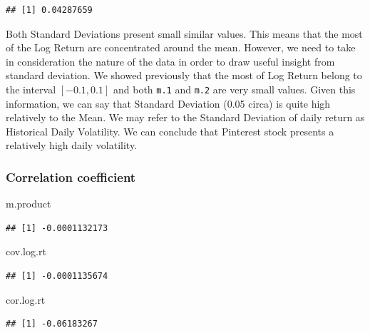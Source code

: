 \documentclass[
]{article}
\newenvironment{Shaded}{\begin{snugshade}}{\end{snugshade}}
\newcommand{\NormalTok}[1]{#1}
\begin{document}
\begin{verbatim}
## [1] 0.04287659
\end{verbatim}

Both Standard Deviations present small similar values. This means that
the most of the Log Return are concentrated around the mean. However, we
need to take in consideration the nature of the data in order to draw
useful insight from standard deviation. We showed previously that the
most of Log Return belong to the interval \([-0.1, 0.1]\) and both
\texttt{m.1} and \texttt{m.2} are very small values. Given this
information, we can say that Standard Deviation (0.05 circa) is quite
high relatively to the Mean. We may refer to the Standard Deviation of
daily return as Historical Daily Volatility. We can conclude that
Pinterest stock presents a relatively high daily volatility.

\hypertarget{correlation-coefficient}{%
\subsubsection{Correlation coefficient}\label{correlation-coefficient}}

\begin{Shaded}
\begin{Highlighting}[]
\NormalTok{m.product}
\end{Highlighting}
\end{Shaded}

\begin{verbatim}
## [1] -0.0001132173
\end{verbatim}

\begin{Shaded}
\begin{Highlighting}[]
\NormalTok{cov.log.rt}
\end{Highlighting}
\end{Shaded}

\begin{verbatim}
## [1] -0.0001135674
\end{verbatim}

\begin{Shaded}
\begin{Highlighting}[]
\NormalTok{cor.log.rt}
\end{Highlighting}
\end{Shaded}

\begin{verbatim}
## [1] -0.06183267
\end{verbatim}
\end{document}
